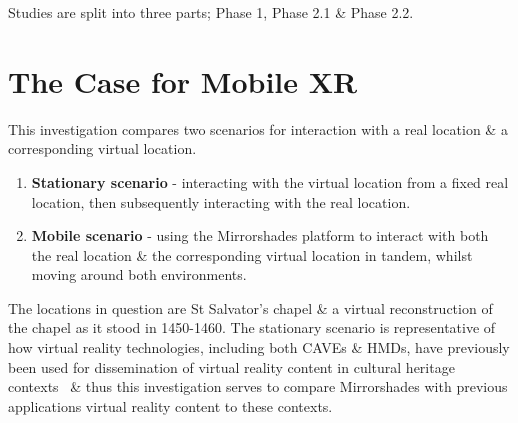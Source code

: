 
Studies are split into three parts; Phase 1, Phase 2.1 \& Phase 2.2.

\section{The Case for Mobile XR}
This investigation compares two scenarios for interaction with a real location \& a corresponding virtual location.

\begin{enumerate}
	\item \textbf{Stationary scenario} - interacting with the virtual location from a fixed real location, then subsequently interacting with the real location.
	\item \textbf{Mobile scenario} - using the Mirrorshades platform to interact with both the real location \& the corresponding virtual location in tandem, whilst moving around both environments.
\end{enumerate}

The locations in question are St Salvator's chapel \& a virtual reconstruction of the chapel as it stood in 1450-1460. The stationary scenario is representative of how virtual reality technologies, including both CAVEs \& HMDs, have previously been used for dissemination of virtual reality content in cultural heritage contexts~\cite{Roussou2002} \& thus this investigation serves to compare Mirrorshades with previous applications virtual reality content to these contexts.

